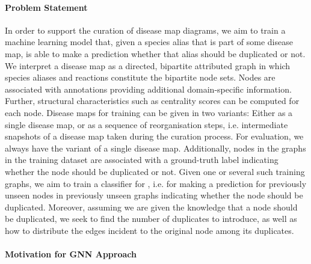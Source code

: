\documentclass[
	fontsize=10pt, %
	twoside=false, %
	secnumdepth=1, %
  toc=indentunnumbered %
]{kaobook}
\begin{document}
\paragraph{Problem Statement} 
In order to support the curation of disease map diagrams, we aim to train a
machine learning model that, given a species alias that is part of some disease
map, is able to make a prediction whether that alias should be duplicated or
not.
%
We interpret a disease map as a directed, bipartite attributed graph in which
species aliases and reactions constitute the bipartite node sets. Nodes are
associated with annotations providing additional domain-specific information.
Further, structural characteristics such as centrality scores can be computed
for each node.
%
Disease maps for training can be given in two variants: Either as a single
disease map, or as a sequence of reorganisation steps, i.e. intermediate
snapshots of a disease map taken during the curation process. For evaluation, we
always have the variant of a single disease map.
%
Additionally, nodes in the graphs in the training dataset are associated with
a ground-truth label indicating whether the node should be duplicated or not.
Given one or several such training graphs, we aim to train a classifier for
, i.e. for making a prediction for previously unseen
nodes in previously unseen graphs indicating whether the node should be duplicated.
%
Moreover, assuming we are given the knowledge that a node should be duplicated,
we seek to find the number of duplicates to introduce, as well as how to
distribute the edges incident to the original node among its duplicates.


\paragraph{Motivation for GNN Approach}
\end{document}
